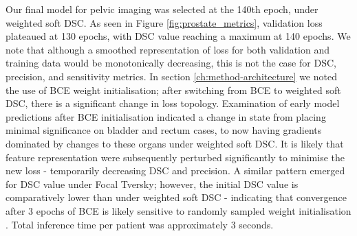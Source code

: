

Our final model for pelvic imaging was selected at the 140th epoch, under weighted soft DSC. As seen in Figure \ref{fig:prostate_metrics}, validation loss plateaued at 130 epochs, with DSC value reaching a maximum at 140 epochs. We note that although a smoothed representation of loss for both validation and training data would be monotonically decreasing, this is not the case for DSC, precision, and sensitivity metrics. In section \ref{ch:method-architecture} we noted the use of BCE weight initialisation; after switching from BCE to weighted soft DSC, there is a significant change in loss topology. Examination of early model predictions after BCE initialisation indicated a change in state from placing minimal significance on bladder and rectum cases, to now having gradients dominated by changes to these organs under weighted soft DSC. It is likely that feature representation were subsequently perturbed significantly to minimise the new loss - temporarily decreasing DSC and precision. A similar pattern emerged for DSC value under Focal Tversky; however, the initial DSC value is comparatively lower than under weighted soft DSC - indicating that convergence after 3 epochs of BCE is likely sensitive to randomly sampled weight initialisation \cite{Ronneberger_2015}. Total inference time per patient was approximately 3 seconds.

